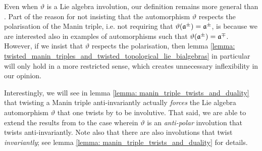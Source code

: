         \begin{remark}
            Even when $\vartheta$ is a Lie algebra involution, our definition remains more general than \cite[Definition 2.1]{belliard_crampe_coideal_subalgebras_from_twisted_manin_triples}. Part of the reason for not insisting that the automorphism $\vartheta$ respects the polarisation of the Manin triple, i.e. not requiring that $\vartheta(\mathfrak{a}^{\pm}) = \mathfrak{a}^{\pm}$, is because we are interested also in examples of automorphisms such that $\vartheta(\mathfrak{a}^{\pm}) = \mathfrak{a}^{\mp}$. However, if we insist that $\vartheta$ respects the polarisation, then lemma \ref{lemma: twisted_manin_triples_and_twisted_topological_lie_bialgebras} in particular will only hold in a more restricted sense, which creates unnecessary inflexibility in our opinion.

            Interestingly, we will see in lemma \ref{lemma: manin_triple_twists_and_duality} that twisting a Manin triple anti-invariantly actually \textit{forces} the Lie algebra automorphism $\vartheta$ that one twists by to be involutive. That said, we are able to extend the results from \cite{belliard_crampe_coideal_subalgebras_from_twisted_manin_triples} to the case wherein $\vartheta$ is an \textit{anti-polar} involution that twists anti-invariantly. Note also that there are also involutions that twist \textit{invariantly}; see lemma \ref{lemma: manin_triple_twists_and_duality} for details.
        \end{remark}

